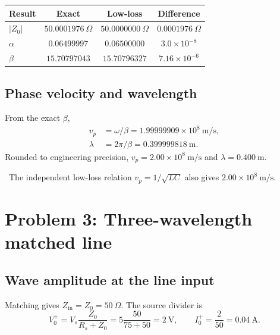 \documentclass[12pt,a4paper]{article}
\begin{document}
\begin{center}
\renewcommand{\arraystretch}{1.2}
\begin{tabular}{lccc}
\toprule
Result & Exact & Low-loss & Difference \\
\midrule
$|Z_0|$ & $50.0001976~\Omega$ & $50.0000000~\Omega$ & $0.0001976~\Omega$ \\
$\alpha$ & $0.06499997$ & $0.06500000$ & $3.0\times10^{-8}$ \\
$\beta$ & $15.70797043$ & $15.70796327$ & $7.16\times10^{-6}$ \\
\bottomrule
\end{tabular}
\end{center}

\subsection{Phase velocity and wavelength}

From the exact $\beta$,
\begin{align}
v_p&=\omega/\beta=1.99999909\times10^8~\mathrm{m/s},\\
\lambda&=2\pi/\beta=0.399999818~\mathrm{m}.
\end{align}
Rounded to engineering precision, $v_p=2.00\times10^8~\mathrm{m/s}$ and
$\lambda=0.400~\mathrm{m}$.

\checkmarktext\ The independent low-loss relation
$v_p=1/\sqrt{LC}$ also gives $2.00\times10^8~\mathrm{m/s}$.


\section{Problem 3: Three-wavelength matched line}


\subsection{Wave amplitude at the line input}

Matching gives $Z_{\mathrm{in}}=Z_0=50~\Omega$.  The source divider is
\[
V_0^+=V_s\frac{Z_0}{R_s+Z_0}
=5\frac{50}{75+50}=2~\mathrm{V},
\qquad I_0^+=\frac{2}{50}=0.04~\mathrm{A}.
\]
\end{document}
